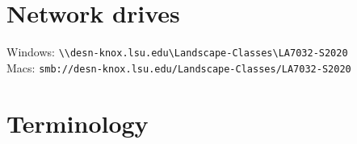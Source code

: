 \documentclass[11pt,article,oneside]{memoir}
\begin{document}
\section{Network drives}

\noindent
Windows: \verb|\\desn-knox.lsu.edu\Landscape-Classes\LA7032-S2020| \\

\noindent
Macs: \verb|smb://desn-knox.lsu.edu/Landscape-Classes/LA7032-S2020| \\

\section{Terminology}
\end{document}
